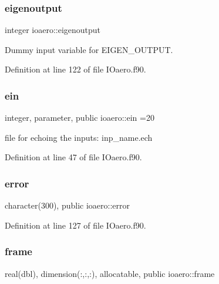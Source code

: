 \subsubsection{\texorpdfstring{eigenoutput}{eigenoutput}}
{\footnotesize\ttfamily integer ioaero\+::eigenoutput\hspace{0.3cm}{\ttfamily [private]}}



Dummy input variable for E\+I\+G\+E\+N\+\_\+\+O\+U\+T\+P\+UT. 



Definition at line 122 of file I\+Oaero.\+f90.

\mbox{\label{namespaceioaero_a6a4b9f5362e2eee64e5777786065f563}} 
\subsubsection{\texorpdfstring{ein}{ein}}
{\footnotesize\ttfamily integer, parameter, public ioaero\+::ein =20}



file for echoing the inputs\+: inp\+\_\+name.\+ech 



Definition at line 47 of file I\+Oaero.\+f90.

\mbox{\label{namespaceioaero_aebd85ae2a176f49a7213d8ed7b68f887}} 
\subsubsection{\texorpdfstring{error}{error}}
{\footnotesize\ttfamily character(300), public ioaero\+::error}



Definition at line 127 of file I\+Oaero.\+f90.

\mbox{\label{namespaceioaero_a26d467b1adbb838f4b1ba3dd4ee1ea0d}} 
\subsubsection{\texorpdfstring{frame}{frame}}
{\footnotesize\ttfamily real(dbl), dimension(\+:,\+:,\+:), allocatable, public ioaero\+::frame}



